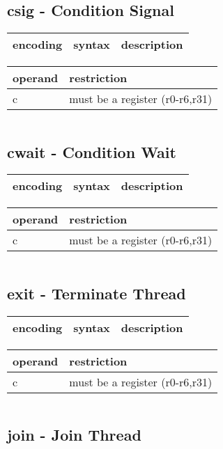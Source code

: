 \documentclass[letterpaper,10pt,openright,twoside,onecolumn]{book}
\begin{document}
\subsection{csig - Condition Signal}
  \begin{tabular}{|l|l|l|}
   \hline
    encoding & syntax & description \\
   \hline
   \hline
  \end{tabular}
  \flushleft
  \begin{tabular}{|l|l|}
   \hline
    operand & restriction \\
   \hline
    c & must be a register (r0-r6,r31) \\
   \hline
  \end{tabular}
  \begin{verbatim}
  \end{verbatim}
\newpage\subsection{cwait - Condition Wait}
  \begin{tabular}{|l|l|l|}
   \hline
    encoding & syntax & description \\
   \hline
   \hline
  \end{tabular}
  \flushleft
  \begin{tabular}{|l|l|}
   \hline
    operand & restriction \\
   \hline
    c & must be a register (r0-r6,r31) \\
   \hline
  \end{tabular}
  \begin{verbatim}
  \end{verbatim}
\newpage\subsection{exit - Terminate Thread}
  \begin{tabular}{|l|l|l|}
   \hline
    encoding & syntax & description \\
   \hline
   \hline
  \end{tabular}
  \flushleft
  \begin{tabular}{|l|l|}
   \hline
    operand & restriction \\
   \hline
    c & must be a register (r0-r6,r31) \\
   \hline
  \end{tabular}
  \begin{verbatim}
  \end{verbatim}
\newpage\subsection{join - Join Thread}
\end{document}
